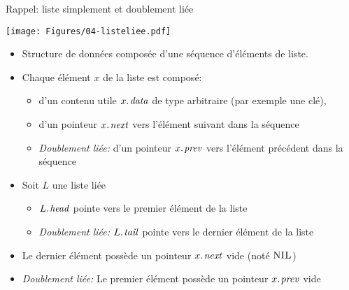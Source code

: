 \begin{frame}{Rappel: liste simplement et doublement liée}

\centerline{\texttt{[image: Figures/04-listeliee.pdf]}}

\bigskip

\begin{itemize}
\item Structure de données composée d'une séquence d'éléments de liste.
\item Chaque élément $x$ de la liste est composé:
\begin{itemize}
\item d'un contenu utile $\attrib{x}{data}$ de type arbitraire (par exemple une clé),
\item d'un pointeur $\attrib{x}{next}$ vers l'élément suivant dans la séquence
\item \emph{Doublement liée: }d'un pointeur $\attrib{x}{prev}$ vers l'élément précédent dans la séquence
\end{itemize}
\item Soit $L$ une liste liée
\begin{itemize}
\item $\attrib{L}{head}$ pointe vers le premier élément de la liste
\item \emph{Doublement liée:} $\attrib{L}{tail}$ pointe vers le dernier élément de la liste
\end{itemize}
\item Le dernier élément possède un pointeur $\attrib{x}{next}$ vide (noté $\textnormal{\scshape NIL}$)
\item \emph{Doublement liée:} Le premier élément possède un pointeur $\attrib{x}{prev}$ vide
\end{itemize}
\end{frame}


